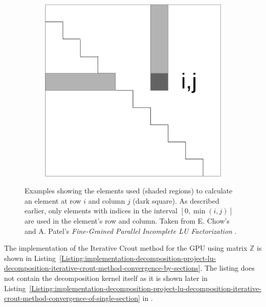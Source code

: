 \begin{figure}[h!]
\begin{subfigure}{.5\textwidth}
		\includegraphics[width=.8\textwidth, keepaspectratio]{images/ch2/LU_decomposition_crout_method_visualization_elements_used_simple_upper.png}
		\label{Figure:implementation-decomposition-project-lu-decomposition-element-dependance-upper}
	\end{subfigure}
	\caption{Examples showing the elements used (shaded regions) to calculate an element at row $ i $ and column $ j $ (dark square). As described earlier, only elements with indices in the interval $ \left[0, \min(i, j)\right] $ are used in the element's row and column. Taken from E. Chow's and A. Patel's \emph{Fine-Grained Parallel Incomplete LU Factorization} \cite{Chow2015}.}
	\label{Figure:implementation-decomposition-project-lu-decomposition-element-dependance}
\end{figure}

The implementation of the Iterative Crout method for the GPU using matrix $ \mathbb{Z} $ is shown in Listing~\ref{Listing:implementation-decomposition-project-lu-decomposition-iterative-crout-method-convergence-by-sections}. The listing does not contain the decomposition kernel itself as it is shown later in Listing~\ref{Listing:implementation-decomposition-project-lu-decomposition-iterative-crout-method-convergence-of-single-section} in \textit{}.

